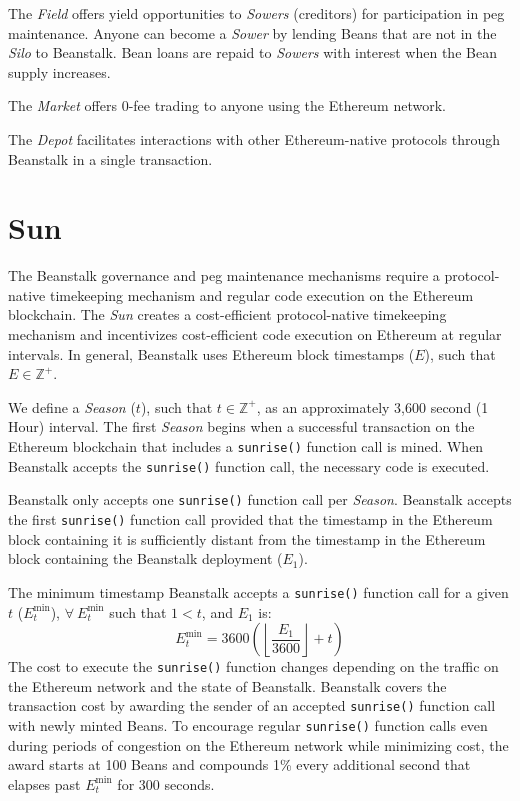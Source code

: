 \documentclass[tikz]{article}
\newcommand{\code}[1]{\texttt{#1}}
\newcommand{\term}[1]{\textsl{#1}}
\begin{document}
The \term{Field} offers yield opportunities to \term{Sowers} (creditors) for participation in peg maintenance. Anyone can become a \term{Sower} by lending Beans that are not in the \term{Silo} to Beanstalk. Bean loans are repaid to \term{Sowers} with interest when the Bean supply increases. 

The \term{Market} offers 0-fee trading to anyone using the Ethereum network.

The \term{Depot} facilitates interactions with other Ethereum-native protocols through Beanstalk in a single transaction.

\section{Sun}
The Beanstalk governance and peg maintenance mechanisms require a protocol-native timekeeping mechanism and regular code execution on the Ethereum blockchain. The \term{Sun} creates a cost-efficient protocol-native timekeeping mechanism and incentivizes cost-efficient code execution on Ethereum at regular intervals. In general, Beanstalk uses Ethereum block timestamps ($E$), such that $E \in \mathbb{Z}^{+}$.

We define a \term{Season} ($t$), such that $t \in \mathbb{Z}^{+}$, as an approximately 3,600 second (1 Hour) interval. The first \term{Season} begins when a successful transaction on the Ethereum blockchain that includes a \code{sunrise()} function call is mined. When Beanstalk accepts the \code{sunrise()} function call, the necessary code is executed.

Beanstalk only accepts one \code{sunrise()} function call per \term{Season}. Beanstalk accepts the first \code{sunrise()} function call provided that the timestamp in the Ethereum block containing it is sufficiently distant from the timestamp in the Ethereum block containing the Beanstalk deployment ($E_1$).

The minimum timestamp Beanstalk accepts a \code{sunrise()} function call for a given $t$ ($E_{t}^{\text{min}}$), $\forall\ E_{t}^{\text{min}}$ such that $1 < t$, and $E_1$ is:
$$E_{t}^{\text{min}} = 3600{\left({\left\lfloor\frac{E_1}{3600}\right\rfloor} + t\right)}$$
The cost to execute the \code{sunrise()} function changes depending on the traffic on the Ethereum network and the state of Beanstalk. Beanstalk covers the transaction cost by awarding the sender of an accepted \code{sunrise()} function call with newly minted Beans. To encourage regular \code{sunrise()} function calls even during periods of congestion on the Ethereum network while minimizing cost, the award starts at 100 Beans and compounds 1\% every additional second that elapses past $E_{t}^{\text{min}}$ for 300 seconds.
\end{document}
